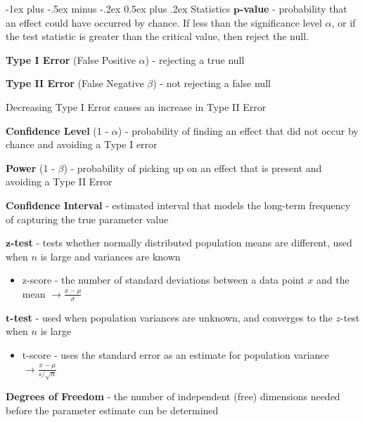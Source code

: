 \documentclass[10pt,landscape]{article}
\makeatletter
\renewcommand{\section}{\@startsection{section}{1}{0mm}%
                                {-1ex plus -.5ex minus -.2ex}%
                                {0.5ex plus .2ex}%
                                {\normalfont\large\bfseries}}
\makeatother
\begin{document}
\begin{multicols}{3}
        \section{Statistics}
    $\boldsymbol p$\textbf{-value} - probability that an effect could have occurred by chance. If less than the significance level $\alpha$, or if the test statistic is greater than the critical value, then reject the null.

        \textbf{Type I Error} (False Positive $\alpha$) - rejecting a true null

        \textbf{Type II  Error} (False Negative $\beta$)  - not rejecting a false null

        Decreasing Type I Error causes an increase in Type II Error

        \textbf{Confidence Level} (1 - $\alpha$) - probability of finding an effect that did not occur by chance and avoiding a Type I error

        \textbf{Power} (1 - $\beta$) - probability of picking up on an effect that is present and avoiding a Type II Error

        \textbf{Confidence Interval} - estimated interval that models the long-term frequency of capturing the true parameter value

    $\boldsymbol{z}$\textbf{-test} - tests whether normally distributed population means are different, used when $n$ is large and variances are known
        \vspace{-.5mm}
        \begin{itemize}[label={--},leftmargin=4mm]
            \itemsep -.4mm
            \item z-score - the number of standard deviations between a data point $x$ and the mean $\to \frac{x - \mu}{\sigma}$
        \end{itemize}
        \vspace{-.5mm}
    $\boldsymbol{t}$\textbf{-test} - used when population variances are unknown, and converges to the $z$-test when $n$ is large
        \vspace{-.5mm}
        \begin{itemize}[label={--},leftmargin=4mm]
            \itemsep -.4mm
            \item t-score - uses the standard error as an estimate for population variance $\to \frac{x - \mu}{s/\sqrt{n}}$
        \end{itemize}
        \vspace{-1mm}
        \textbf{Degrees of Freedom} - the number of independent (free) dimensions needed before the parameter estimate can be determined


\end{multicols}
\end{document}
